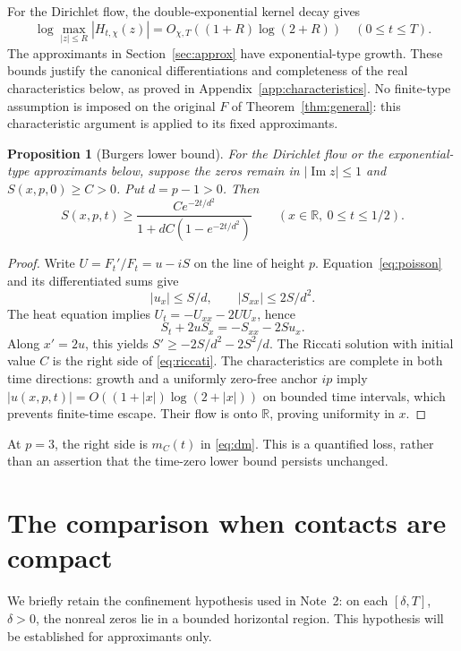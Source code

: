 \documentclass[11pt]{article}
\newtheorem{proposition}[theorem]{Proposition}
\theoremstyle{remark}\newtheorem{remark}[theorem]{Remark}
\newcommand{\Ima}{\operatorname{Im}}
\begin{document}
For the Dirichlet flow, the double-exponential kernel decay gives
\begin{equation}
 \log\max_{|z|\le R}|H_{t,\chi}(z)|
 =O_{\chi,T}((1+R)\log(2+R))\quad(0\le t\le T).
 \label{eq:growth}
\end{equation}
The approximants in Section~\ref{sec:approx} have exponential-type growth.
These bounds justify the canonical differentiations and completeness
of the real characteristics below, as proved in
Appendix~\ref{app:characteristics}. No finite-type assumption is imposed
on the original $F$ of Theorem~\ref{thm:general}: this characteristic
argument is applied to its fixed approximants.

\begin{proposition}[Burgers lower bound]\label{prop:floor}
For the Dirichlet flow or the exponential-type approximants below,
suppose the zeros remain in $|\Ima z|\le1$ and $S(x,p,0)\ge C>0$.
Put $d=p-1>0$. Then
\begin{equation}
 S(x,p,t)\ge
 \frac{Ce^{-2t/d^2}}{1+dC(1-e^{-2t/d^2})}
 \qquad(x\in\mathbb R,\ 0\le t\le1/2).\label{eq:riccati}
\end{equation}
\end{proposition}
\begin{proof}
Write $U=F_t'/F_t=u-iS$ on the line of height $p$.
Equation~\eqref{eq:poisson} and its differentiated sums give
\[ |u_x|\le S/d,\qquad |S_{xx}|\le2S/d^2. \]
The heat equation implies $U_t=-U_{xx}-2UU_x$, hence
\[ S_t+2uS_x=-S_{xx}-2Su_x. \]
Along $x'=2u$, this yields $S'\ge-2S/d^2-2S^2/d$.
The Riccati solution with initial value $C$ is the right side of
\eqref{eq:riccati}. The characteristics are complete in both time
directions: growth and a uniformly zero-free anchor $ip$ imply
$|u(x,p,t)|=O((1+|x|)\log(2+|x|))$ on bounded time intervals, which
prevents finite-time escape. Their flow is onto $\mathbb R$, proving
uniformity in $x$.
\end{proof}

At $p=3$, the right side is $m_C(t)$ in \eqref{eq:dm}. This is a
quantified loss, rather than an assertion that the time-zero lower bound
persists unchanged.

\section{The comparison when contacts are compact}
We briefly retain the confinement hypothesis used in Note~2: on each
$[\delta,T]$, $\delta>0$, the nonreal zeros lie in a bounded horizontal
region. This hypothesis will be established for approximants only.
\end{document}

